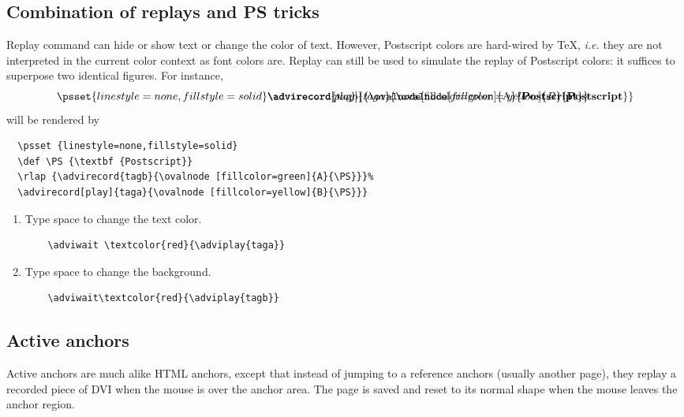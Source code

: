 \documentclass[12pt]{article}
\begin{document}
\newpage

\subsection* {Combination of replays and PS tricks}

Replay command can hide or show text or change the color of text. 
However, Postscript colors are hard-wired by {\TeX}, {\em i.e.} they are not
interpreted in the current color context as font colors are.
\noindent
Replay can still be used to simulate the replay of Postscript colors:
it suffices to superpose two identical figures. For instance, 
$$
\psset {linestyle=none,fillstyle=solid}
\rlap
{\advirecord{tagb}{\ovalnode [fillcolor=green]{A}{\textbf {Postscript}}}}%
\advirecord[play]{taga}{\ovalnode [fillcolor=yellow]{B}{\textbf {Postscript}}}
$$
will  be rendered by
\begin{verbatim}
  \psset {linestyle=none,fillstyle=solid}
  \def \PS {\textbf {Postscript}}
  \rlap {\advirecord{tagb}{\ovalnode [fillcolor=green]{A}{\PS}}}%
  \advirecord[play]{taga}{\ovalnode [fillcolor=yellow]{B}{\PS}}}
\end{verbatim}
\begin {enumerate}

\item Type space to change the text color. 
\adviwait \textcolor{red}{}
\begin{verbatim}
    \adviwait \textcolor{red}{\adviplay{taga}}
\end{verbatim}

\item Type space to change the background.
\adviwait\textcolor{red}{}
\begin{verbatim}
    \adviwait\textcolor{red}{\adviplay{tagb}}
\end{verbatim}

\end {enumerate}

\newpage

\subsection*{Active anchors}

Active anchors are much alike HTML anchors, except that instead of
jumping to a reference anchors (usually another page), they 
replay a recorded piece of DVI when the mouse is over the
anchor area. The page is saved and reset to its normal shape when the mouse
leaves the anchor region.
\end{document}
